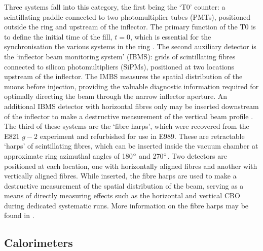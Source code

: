 Three systems fall into this category, the first being the `T0' counter: a scintillating paddle connected to two photomultiplier tubes (PMTs), positioned outside the ring and upstream of the inflector. The primary function of the T0 is to define the initial time of the fill, $t=0$, which is essential for the synchronisation the various systems in the ring \cite{T0}. The second auxiliary detector is the `inflector beam monitoring system' (IBMS): grids of scintillating fibres connected to silicon photomultipliers (SiPMs), positioned at two locations upstream of the inflector. The IMBS measures the spatial distribution of the muons before injection, providing the valuable diagnostic information required for optimally directing the beam through the narrow inflector aperture. An additional IBMS detector with horizontal fibres only may be inserted downstream of the inflector to make a destructive measurement of the vertical beam profile \cite{IBMS}. The third of these systems are the `fibre harps', which were recovered from the E821 $g-2$ experiment and refurbished for use in E989. These are retractable `harps' of scintillating fibres, which can be inserted inside the vacuum chamber at approximate ring azimuthal angles of 180$\degree$ and 270$\degree$. Two detectors are positioned at each location, one with horizontally aligned fibres and another with vertically aligned fibres. While inserted, the fibre harps are used to make a destructive measurement of the spatial distribution of the beam, serving as a means of directly measuring effects such as the horizontal and vertical CBO during dedicated systematic runs. More information on the fibre harps may be found in \cite{TDR}. 


\subsection{Calorimeters}\label{subsec:Calos}

